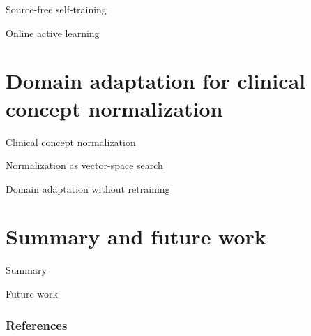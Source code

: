 \documentclass[14pt]{beamer}
\begin{document}
\begin{frame}{Source-free self-training}
\end{frame}

\begin{frame}{Online active learning}
\end{frame}

\section{Domain adaptation for clinical concept normalization}

\begin{frame}{Clinical concept normalization}
\end{frame}

\begin{frame}{Normalization as vector-space search}
\end{frame}

\begin{frame}{Domain adaptation without retraining}
\end{frame}

\section*{Summary and future work}

\begin{frame}{Summary}
\end{frame}

\begin{frame}{Future work}
\end{frame}

\appendix

\begin{frame}[allowframebreaks]
        \frametitle{References}
        
        
\end{frame}
\end{document}
